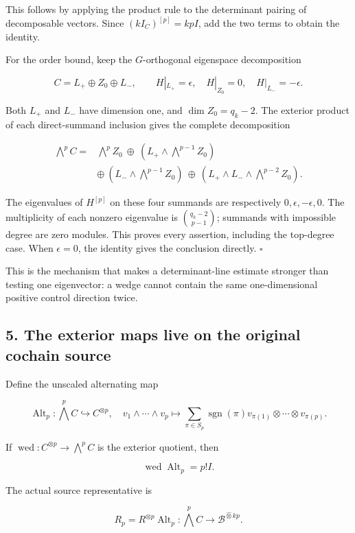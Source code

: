 This follows by applying the product rule to the determinant pairing of
decomposable vectors. Since \((kI_C)^{[p]}=kpI\), add the two terms to
obtain the identity.

For the order bound, keep the \(G\)-orthogonal eigenspace decomposition

\[
C=L_+\oplus Z_0\oplus L_-,
\qquad H|_{L_+}=\epsilon,\quad H|_{Z_0}=0,\quad H|_{L_-}=-\epsilon.
\]

Both \(L_+\) and \(L_-\) have dimension one, and \(\dim Z_0=q_k-2\). The
exterior product of each direct-summand inclusion gives the complete
decomposition

\[
\begin{aligned}
\bigwedge^p C={}&\bigwedge^p Z_0
\ \oplus\ (L_+\wedge\bigwedge^{p-1}Z_0)\\
&\oplus\ (L_-\wedge\bigwedge^{p-1}Z_0)
\ \oplus\ (L_+\wedge L_-\wedge\bigwedge^{p-2}Z_0).
\end{aligned}
\]

The eigenvalues of \(H^{[p]}\) on these four summands are respectively
\(0,\epsilon,-\epsilon,0\). The multiplicity of each nonzero eigenvalue
is \(\binom{q_k-2}{p-1}\); summands with impossible degree are zero
modules. This proves every assertion, including the top-degree case.
When \(\epsilon=0\), the identity gives the conclusion directly.
\(\square\)

This is the mechanism that makes a determinant-line estimate stronger
than testing one eigenvector: a wedge cannot contain the same
one-dimensional positive control direction twice.

\subsection{5. The exterior maps live on the original cochain
source}\label{exterior_trace:the-exterior-maps-live-on-the-original-cochain-source}

Define the unscaled alternating map

\[
\operatorname{Alt}_p:\bigwedge^p C\hookrightarrow C^{\otimes p},
\quad
v_1\wedge\cdots\wedge v_p\mapsto
\sum_{\pi\in S_p}\operatorname{sgn}(\pi)
 v_{\pi(1)}\otimes\cdots\otimes v_{\pi(p)}.
\]

If \(\operatorname{wed}:C^{\otimes p}\to\bigwedge^p C\) is the exterior
quotient, then

\[
\operatorname{wed}\operatorname{Alt}_p=p!I.
\]

The actual source representative is

\[
\boxed{
R_p=R^{\otimes p}\operatorname{Alt}_p:
\bigwedge^p C\longrightarrow\mathscr B^{\widehat\otimes kp}.
}
\]

